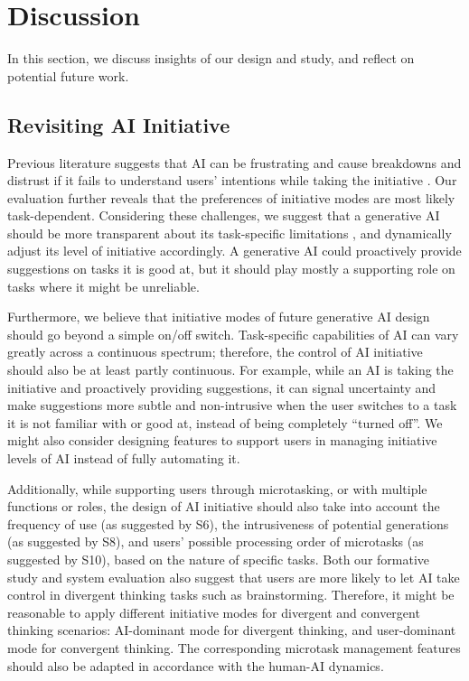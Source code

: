 \section{Discussion}
In this section, we discuss insights of our design and study, and reflect on potential future work.
\subsection{Revisiting AI Initiative}
Previous literature suggests that AI can be frustrating and cause breakdowns and distrust if it fails to understand users' intentions while taking the initiative \cite{buschek2018researchime,clark2018creative,oh2018lead}. Our evaluation further reveals that the preferences of initiative modes are most likely task-dependent.
Considering these challenges, we suggest that a generative AI should be more transparent about its task-specific limitations \cite{smith2022real}, and dynamically adjust its level of initiative accordingly. A generative AI could proactively provide suggestions on tasks it is good at, but it should play mostly a supporting role on tasks where it might be unreliable.

Furthermore, we believe that initiative modes of future generative AI design should go beyond a simple on/off switch. Task-specific capabilities of AI can vary greatly across a continuous spectrum; therefore, the control of AI initiative should also be at least partly continuous. For example, while an AI is taking the initiative and proactively providing suggestions, it can signal uncertainty and make suggestions more subtle and non-intrusive when the user switches to a task it is not familiar with or good at, instead of being completely ``turned off''.
We might also consider designing features to support users in managing initiative levels of AI instead of fully automating it.

Additionally, while supporting users through microtasking, or with multiple functions or roles, the design of AI initiative should also take into account the frequency of use (as suggested by S6), the intrusiveness of potential generations (as suggested by S8), and users' possible processing order of microtasks (as suggested by S10), based on the nature of specific tasks.
Both our formative study and system evaluation also suggest that users are more likely to let AI take control in divergent thinking tasks such as brainstorming. Therefore, it might be reasonable to apply different initiative modes for divergent and convergent thinking scenarios: AI-dominant mode for divergent thinking, and user-dominant mode for convergent thinking. The corresponding microtask management features should also be adapted in accordance with the human-AI dynamics.

